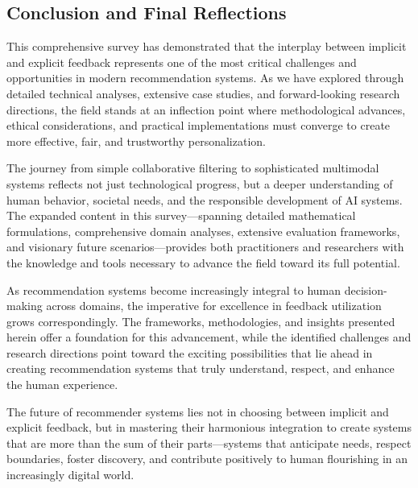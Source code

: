 \subsection{Conclusion and Final Reflections}

This comprehensive survey has demonstrated that the interplay between implicit and explicit feedback represents one of the most critical challenges and opportunities in modern recommendation systems. As we have explored through detailed technical analyses, extensive case studies, and forward-looking research directions, the field stands at an inflection point where methodological advances, ethical considerations, and practical implementations must converge to create more effective, fair, and trustworthy personalization.

The journey from simple collaborative filtering to sophisticated multimodal systems reflects not just technological progress, but a deeper understanding of human behavior, societal needs, and the responsible development of AI systems. The expanded content in this survey—spanning detailed mathematical formulations, comprehensive domain analyses, extensive evaluation frameworks, and visionary future scenarios—provides both practitioners and researchers with the knowledge and tools necessary to advance the field toward its full potential.

As recommendation systems become increasingly integral to human decision-making across domains, the imperative for excellence in feedback utilization grows correspondingly. The frameworks, methodologies, and insights presented herein offer a foundation for this advancement, while the identified challenges and research directions point toward the exciting possibilities that lie ahead in creating recommendation systems that truly understand, respect, and enhance the human experience.

The future of recommender systems lies not in choosing between implicit and explicit feedback, but in mastering their harmonious integration to create systems that are more than the sum of their parts—systems that anticipate needs, respect boundaries, foster discovery, and contribute positively to human flourishing in an increasingly digital world.
